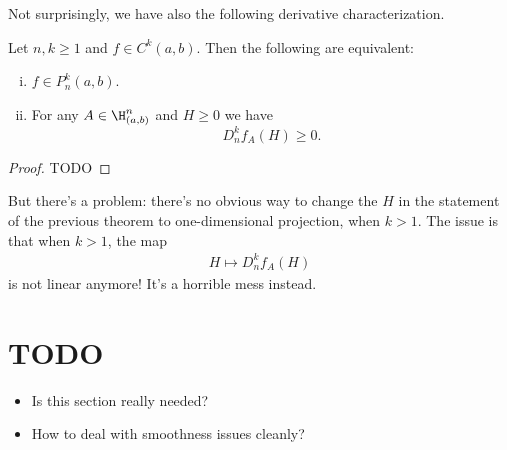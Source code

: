 Not surprisingly, we have also the following derivative characterization.

\begin{lause}
	Let $n, k \geq 1$ and $f \in C^{k}(a, b)$.
	Then the following are equivalent:
	\begin{enumerate}[(i)]
	\item $f \in P^{k}_{n}(a, b)$.
	\item For any $A \in \H^{n}_{(a, b)}$ and $H \geq 0$ we have
	\[
		D^{k}_{n}f_{A}(H) \geq 0.
	\]
	\end{enumerate}
\end{lause}
\begin{proof}
	TODO
\end{proof}

But there's a problem: there's no obvious way to change the $H$ in the statement of the previous theorem to one-dimensional projection, when $k > 1$. The issue is that when $k > 1$, the map
\begin{align*}
	H \mapsto D^{k}_{n}f_{A}(H)
\end{align*}
is not linear anymore! It's a horrible mess instead.

\section{TODO}

\begin{itemize}
	\item Is this section really needed?
	\item How to deal with smoothness issues cleanly?
\end{itemize}







